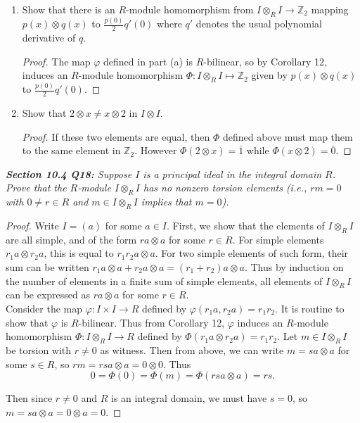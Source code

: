 \documentclass{article}
\begin{document}
\begin{enumerate}[label={(\alph*)}]
    \item Show that there is an $R$-module homomorphism from $I\otimes_R
      I\rightarrow\mathbb{Z}_2$ mapping $p(x)\otimes q(x)$ to
      $\frac{p(0)}{2}q'(0)$ where $q'$ denotes the usual polynomial
      derivative of $q$.

      \begin{proof}
        The map $\varphi$ defined in part (a) is $R$-bilinear, so by
        Corollary 12, induces an $R$-module homomorphism $\Phi:I\otimes_R
        I\mapsto\mathbb{Z}_2$ given by $p(x)\otimes q(x)$ to
        $\frac{p(0)}{2}q'(0)$.
      \end{proof}

    \item Show that $2\otimes x \neq x\otimes2$ in $I\otimes I$.
      \begin{proof}
        If these two elements are equal, then $\Phi$ defined above must map
        them to the same element in $\mathbb{Z}_2$. However $\Phi(2\otimes
        x) =\bar{1}$ while $\Phi(x\otimes2) =\bar{0}$.
      \end{proof}
  \end{enumerate}

\it \textbf{Section 10.4 Q18:} Suppose $I$ is a principal ideal in the
  integral domain $R$. Prove that the $R$-module $I\otimes_R I$ has no
  nonzero torsion elements (i.e., $rm=0$ with $0\neq r\in R$ and $m\in
  I\otimes_R I$ implies that $m=0$).

  \begin{proof}
    Write $I=(a)$ for some $a\in I$. First, we show that the elements of
    $I\otimes_RI$ are all simple, and of the form $ra\otimes a$ for some
    $r\in R$. For simple elements $r_1a\otimes r_2a$, this is equal to
    $r_1r_2a\otimes a$. For two simple elements of such form, their sum
    can be written $r_1a\otimes a+r_2a\otimes a =(r_1+r_2)a\otimes a$.
    Thus by induction on the number of elements in a finite sum of simple
    elements, all elements of $I\otimes_RI$ can be expressed as
    $ra\otimes a$ for some $r\in R$. \\

    Consider the map $\varphi:I\times I\rightarrow R$ defined by
    $\varphi(r_1a,r_2a)=r_1r_2$. It is routine to show that $\varphi$ is
    $R$-bilinear. Thus from Corollary 12, $\varphi$ induces an $R$-module
    homomorphism $\Phi:I\otimes_R I\rightarrow R$ defined by
    $\Phi(r_1a\otimes r_2a)=r_1r_2$. Let $m\in I\otimes_R I$ be torsion
    with $r\neq0$ as witness. Then from above, we can write $m=sa\otimes a$
    for some $s\in R$, so $rm=rsa\otimes a=0\otimes0$. Thus
    \[0=\Phi(0)=\Phi(m)=\Phi(rsa\otimes a)=rs.\]

    Then since $r\neq0$ and $R$ is an integral domain, we must have $s=0$,
    so $m=sa\otimes a=0\otimes a=0$.
  \end{proof}
\end{document}
